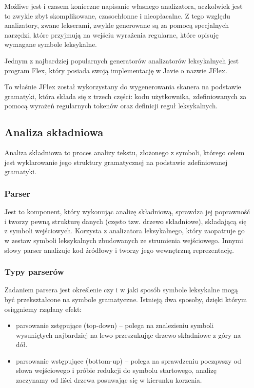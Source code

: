 \documentclass[a4paper,12pt]{article}
\begin{document}
Możliwe jest i czasem konieczne napisanie własnego analizatora, aczkolwiek jest to zwykle zbyt skomplikowane, czasochłonne i nieopłacalne. Z tego względu analizatory, zwane lekserami, zwykle generowane są za pomocą specjalnych narzędzi, które przyjmują na wejściu wyrażenia regularne, które opisuję wymagane symbole leksykalne.

Jednym z najbardziej popularnych generatorów analizatorów leksykalnych jest program Flex\cite{flex}, który posiada swoją implementację w Javie o nazwie JFlex\cite{jflex}.

To właśnie JFlex został wykorzystany do wygenerowania skanera na podstawie gramatyki, która składa się z trzech części: kodu użytkownika, zdefiniowanych za pomocą wyrażeń regularnych tokenów oraz definicji reguł leksykalnych.

\subsection{Analiza składniowa}

Analiza składniowa to proces analizy tekstu, złożonego z symboli, którego celem jest wyklarowanie jego struktury gramatycznej na podstawie zdefiniowanej gramatyki.

\subsubsection{Parser}

Jest to komponent, który wykonując analizę składniową, sprawdza jej poprawność i tworzy pewną strukturę danych (często tzw. drzewo składniowe), składającą się z symboli wejściowych. Korzysta z analizatora leksykalnego, który zaopatruje go w zestaw symboli leksykalnych zbudowanych ze strumienia wejściowego. Innymi słowy parser analizuje kod źródłowy i tworzy jego wewnętrzną reprezentację.

\subsubsection{Typy parserów}

Zadaniem parsera jest określenie czy i w jaki sposób symbole leksykalne mogą być przekształcone na symbole gramatyczne. Istnieją dwa sposoby, dzięki którym osiągniemy rządany efekt:
\begin{itemize}
	\item parsowanie zstępujące (top-down) -- polega na znalezieniu symboli wysuniętych najbardziej na lewo przeszukując drzewo składniowe z góry na dół.
	\item parsowanie wstępujące (bottom-up) -- polega na sprawdzeniu począwszy od słowa wejściowego i próbie redukcji do symbolu startowego, analizę zaczynamy od liści drzewa posuwając się w kierunku korzenia.
\end{itemize}
\end{document}
